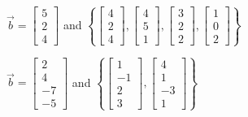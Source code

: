 \documentclass{ximera}
\begin{document}
 \begin{problem}\label{prob:spanofvect2}
 $\vec{b}=\begin{bmatrix}5\\2\\4\end{bmatrix}$ and $\left\{\begin{bmatrix}4\\2\\4\end{bmatrix}, \begin{bmatrix}4\\5\\1\end{bmatrix}, \begin{bmatrix}3\\2\\2\end{bmatrix}, \begin{bmatrix}1\\0\\2\end{bmatrix}\right\}$
 \begin{multipleChoice}
 \end{multipleChoice}
 \end{problem}
 
 \begin{problem}\label{prob:spanofvect3}
 $\vec{b}=\begin{bmatrix}2\\4\\-7\\-5\end{bmatrix}$ and $\left\{\begin{bmatrix}1\\-1\\2\\3\end{bmatrix}, \begin{bmatrix}4\\1\\-3\\1\end{bmatrix}\right\}$
 \begin{multipleChoice}
 \end{multipleChoice}
 \end{problem}
 
\end{document}
